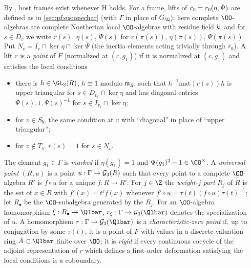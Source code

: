 By , host frames exist whenever $\mathrm{H}$ holds. For a
frame, lifts of $\bar r_0=r_0(\eta,\bar\Psi)$ are defined as in \cref{sec:pf:eis:onechar} (with $\Gamma$ in place of $G_\Q$); here
complete $\OO$-algebras are complete Noetherian local $\OO$-algebras with residue field $k$, and for $s\in D_v$ we write $r(s)$, $\eta(s)$,
$\Psi(s)$ for $r(\pi(s))$, $\eta(\pi(s))$, $\Psi(\pi(s))$. Put $N_v=I_v\cap\ker\eta\cap\ker\bar\Psi$ (the inertia elements acting trivially
through $\bar r_0$). A lift $r$ is a \emph{point} of $F$ (normalized at $(c,g_1)$) if it is
normalized at $(c,g_1)$ and satisfies the local conditions
\begin{itemize}
\item[$(\mathrm P_\ell)$] there is $h\in\GL_3(R)$, $h\equiv1$ modulo $\mathfrak m_R$, such that $h^{-1}\mathrm{mat}(r(s))h$ is upper triangular for
  $s\in D_{v_\ell}\cap\ker\eta$ and has diagonal entries $\Psi(s),1,\Psi(s)^{-1}$ for $s\in I_{v_\ell}\cap\ker\eta$;
\item[$(\mathrm P_b)$] for $v\in S_b$, the same condition at $v$ with ``diagonal'' in place of ``upper triangular'';
\item[$(\mathrm P_0)$] for $v\notin T_b$, $r(s)=1$ for $s\in N_v$.
\end{itemize}
The element $g_1\in\Gamma$ is
\emph{marked} if $\eta(g_1)=1$ and $\Psi(g_1)^2-1\in\OO^\times$. A \emph{universal point} $(R,u)$ is a point $u:\Gamma\to\mathcal G_3(R)$ such
that every point to a complete $\OO$-algebra $R'$ is $f\circ u$ for a unique $f:R\to R'$. For $j\in\Z$ the \emph{weight-$j$ part} $R_j$ of
$R$ is the set of $x\in R$ with $f'(x)=t^jf(x)$ whenever $f'\circ u=\tau(t)(f\circ u)\tau(t)^{-1}$; let $R_\bullet$ be the
$\OO$-subalgebra generated by the $R_j$. For an $\OO$-algebra homomorphism $\xi:R_\bullet\to\Qlbar$, $r_\xi:\Gamma\to\eisGG(\Qlbar)$ denotes
the specialization of $u$. A homomorphism $r:\Gamma\to\eisGG(\Qlbar)$ is a \emph{characteristic-zero point} if, up to conjugation by
some $\tau(t)$, it is a point of $F$ with values in a discrete valuation ring $A\subset\Qlbar$ finite over $\OO$; it is \emph{rigid} if
every continuous cocycle of the adjoint representation of $r$ which defines a first-order deformation satisfying the local
conditions is a coboundary.

